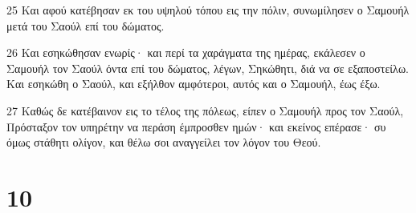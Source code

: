 \par 25 Και αφού κατέβησαν εκ του υψηλού τόπου εις την πόλιν, συνωμίλησεν ο Σαμουήλ μετά του Σαούλ επί του δώματος.
\par 26 Και εσηκώθησαν ενωρίς· και περί τα χαράγματα της ημέρας, εκάλεσεν ο Σαμουήλ τον Σαούλ όντα επί του δώματος, λέγων, Σηκώθητι, διά να σε εξαποστείλω. Και εσηκώθη ο Σαούλ, και εξήλθον αμφότεροι, αυτός και ο Σαμουήλ, έως έξω.
\par 27 Καθώς δε κατέβαινον εις το τέλος της πόλεως, είπεν ο Σαμουήλ προς τον Σαούλ, Πρόσταξον τον υπηρέτην να περάση έμπροσθεν ημών· και εκείνος επέρασε· συ όμως στάθητι ολίγον, και θέλω σοι αναγγείλει τον λόγον του Θεού.

\chapter{10}

